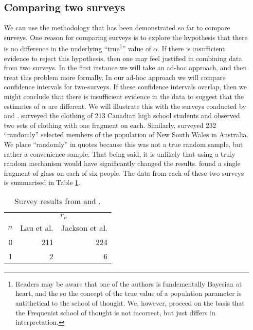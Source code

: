 \documentclass{article}\usepackage[]{graphicx}\usepackage[]{xcolor}
\begin{document}
\subsection{Comparing two surveys}
We can use the methodology that has been demonstrated so far to compare surveys. One reason for comparing surveys is to explore the hypothesis that there is no difference in the underlying ``true\footnote{Readers may be aware that one of the authors is fundementally Bayesian at heart, and the so the concept of the true value of a population parameter is antithetical to the school of thought. We, however, proceed on the basis that the Frequenist school of thought is not incorrect, but just differs in interpretation.}'' value of $\alpha$. If there is insufficient evidence to reject this hypothesis, then one may feel justified in combining data from two surveys. In the first instance we will take an ad-hoc approach, and then treat this problem more formally. In our ad-hoc approach we will compare confidence intervals for two-surveys. If these confidence intervals overlap, then we might conclude that there is insufficient evidence in the data to suggest that the estimates of $\alpha$ are different. We will illustrate this with the surveys conducted by \citet{lau1997} and \citet{jackson2013}. \citet{lau1997} surveyed the clothing of 213 Canadian high school students and observed two sets of clothing with one fragment on each. Similarly, \citet{jackson2013} surveyed 232 ``randomly'' selected members of the population of New South Wales in Australia. We place ``randomly'' in quotes because this was not a true random sample, but rather a convenience sample. That being said, it is unlikely that using a truly random mechanism would have significantly changed the results. \citet{jackson2013} found a single fragment of glass on each of six people. The data from each of these two surveys is summarised in Table \ref{tab:lau_and_jackson}.
\begin{table}[ht]
\centering
\begin{tabular}{r|r|r}
  \multicolumn{1}{c}{} & \multicolumn{2}{c}{$r_n$} \\  $n$ & Lau et al. & Jackson et al.  \\ \hline
0 & 211 & 224 \\ 
  1 & 2 & 6 \\ 
  \end{tabular}
\caption{Survey results from \citet{lau1997} and \citet{jackson2013}.} 
\label{tab:lau_and_jackson}
\end{table}
\end{document}
